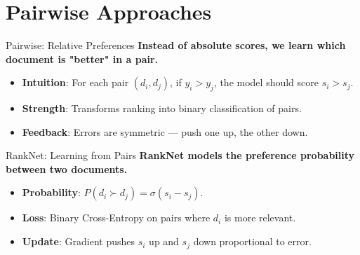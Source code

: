 \documentclass[aspectratio=169]{beamer}
\newif\ifanimated
\newcommand{\cpause}{\ifanimated\pause\fi}
\begin{document}
\section{Pairwise Approaches}

\begin{frame}[plain]
\sectionpage
\end{frame}

\begin{frame}{Pairwise: Relative Preferences}
\textbf{Instead of absolute scores, we learn which document is "better" in a pair.}

\vspace{0.8em}
\begin{itemize}
    \item \textbf{Intuition}: For each pair $(d_i, d_j)$, if $y_i > y_j$, the model should score $s_i > s_j$.
    \item \textbf{Strength}: Transforms ranking into binary classification of pairs.
    \item \textbf{Feedback}: Errors are symmetric --- push one up, the other down.
\end{itemize}\cpause

\vspace{0.5em}
\begin{center}

\end{center}
\end{frame}

\begin{frame}{RankNet: Learning from Pairs}
\textbf{RankNet models the preference probability between two documents.}

\vspace{0.8em}
\begin{itemize}
    \item \textbf{Probability}: $P(d_i \succ d_j) = \sigma(s_i - s_j)$.
    \item \textbf{Loss}: Binary Cross-Entropy on pairs where $d_i$ is more relevant.
    \item \textbf{Update}: Gradient pushes $s_i$ up and $s_j$ down proportional to error.
\end{itemize}\cpause

\vspace{1em}
\cpause
\begin{center}
\end{center}
\end{frame}
\end{document}

